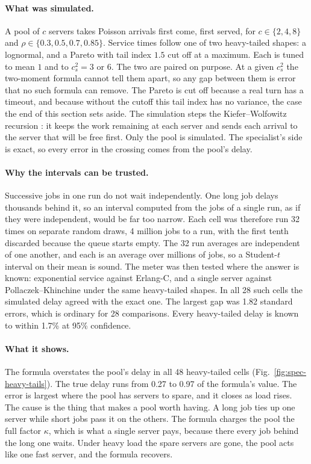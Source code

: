 \documentclass[11pt,a4paper]{article}
\theoremstyle{definition}
\theoremstyle{plain}
\begin{document}
\paragraph{What was simulated.} A pool of $c$ servers takes Poisson arrivals
first come, first served, for $c\in\{2,4,8\}$ and
$\rho\in\{0.3,0.5,0.7,0.85\}$. Service times follow one of two heavy-tailed
shapes: a lognormal, and a Pareto with tail index $1.5$ cut off at a maximum.
Each is tuned to mean $1$ and to $c_s^2=3$ or $6$. The two are paired on
purpose. At a given $c_s^2$ the two-moment formula cannot tell them apart, so
any gap between them is error that no such formula can remove. The Pareto is
cut off because a real turn has a timeout, and because without the cutoff
this tail index has no variance, the case the end of this section sets aside.
The simulation steps the Kiefer--Wolfowitz recursion : it
keeps the work remaining at each server and sends each arrival to the server
that will be free first. Only the pool is simulated. The specialist's side is
exact, so every error in the crossing comes from the pool's delay.

\paragraph{Why the intervals can be trusted.} Successive jobs in one run do
not wait independently. One long job delays thousands behind it, so an
interval computed from the jobs of a single run, as if they were independent,
would be far too narrow. Each cell was therefore run 32 times on separate
random draws, 4 million jobs to a run, with the first tenth discarded because
the queue starts empty. The 32 run averages are independent of one another,
and each is an average over millions of jobs, so a Student-$t$ interval on
their mean is sound. The meter was then tested where the answer is known:
exponential service against Erlang-C, and a single server against
Pollaczek--Khinchine under the same heavy-tailed shapes. In all 28 such cells
the simulated delay agreed with the exact one. The largest gap was 1.82
standard errors, which is ordinary for 28 comparisons. Every heavy-tailed
delay is known to within 1.7\% at 95\% confidence.

\paragraph{What it shows.} The formula overstates the pool's delay in all 48
heavy-tailed cells (Fig.~\ref{fig:spec-heavy-tails}). The true delay runs
from 0.27 to 0.97 of the formula's value. The error is largest where the pool
has servers to spare, and it closes as load rises. The cause is the thing
that makes a pool worth having. A long job ties up one server while short
jobs pass it on the others. The formula charges the pool the full factor
$\kappa$, which is what a single server pays, because there every job behind
the long one waits. Under heavy load the spare servers are gone, the pool
acts like one fast server, and the formula recovers.
\end{document}
